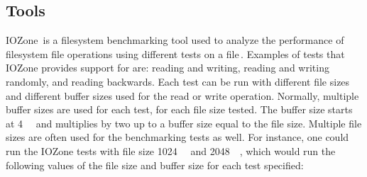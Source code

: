 \subsection{Tools}
IOZone\,\cite{IozoneFilesystemBenchmark} is a filesystem benchmarking tool used to analyze the performance of filesystem file operations using different tests on a file\,\cite{iozoneIozoneFilesystemBenchmark}. Examples of tests that IOZone provides support for are: reading and writing, reading and writing randomly, and reading backwards. Each test can be run with different file sizes and different buffer sizes used for the read or write operation. Normally, multiple buffer sizes are used for each test, for each file size tested. The buffer size starts at \SI{4}{\kilo\byte} and multiplies by two up to a buffer size equal to the file size. Multiple file sizes are often used for the benchmarking tests as well. For instance, one could run the IOZone tests with file size \SI{1024}{\kilo\byte} and \SI{2048}{\kilo\byte}, which would run the following values of the file size and buffer size for each test specified:
